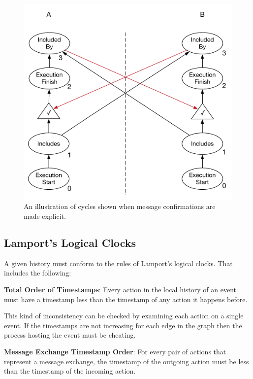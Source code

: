 	\begin{figure}[H]
		\centering
		\includegraphics[height=0.3\textheight]{6validation/images/total-order-of-counterpart-timestamps-cycle-confirmation.pdf}
		\caption{An illustration of cycles shown when message confirmations are made explicit.}
		\label{fig:validation:explicit-message-confirmations}
	\end{figure}
	
	\subsection{Lamport's Logical Clocks}
	A given history must conform to the rules of Lamport's logical clocks. That includes the following:
	
	\begin{ruledef}
		\textbf{Total Order of Timestamps}: Every action in the local history of an event must have a timestamp less than the timestamp of any action it happens before.
		\label{rule:total-order-timestamps}
	\end{ruledef}
	
	\noindent This kind of inconsistency can be checked by examining each action on a single event. If the timestamps are not increasing for each edge in the graph then the process hosting the event must be cheating.
	
	\begin{ruledef}
		\textbf{Message Exchange Timestamp Order}: For every pair of actions that represent a message exchange, the timestamp of the outgoing action must be less than the timestamp of the incoming action.
		\label{rule:message-exchange-timestamp-order}
	\end{ruledef}
	
